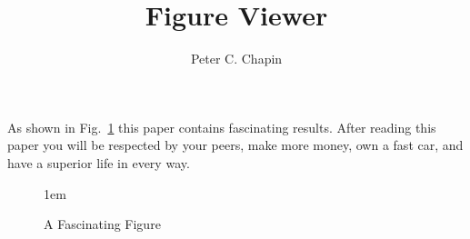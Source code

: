 \documentclass{article}
\newenvironment{textbox}[1]{
  \begin{lrbox}{\savebigbox}
  \begin{minipage}{#1}
  \vspace{1.0em}
}
{
  \vspace{0.50em}
  \end{minipage}
  \end{lrbox}\framebox[\textwidth]{\hfill\fbox{\usebox{\savebigbox}}\hfill}
}
\begin{document}
\title{Figure Viewer}
\author{Peter C. Chapin}
\maketitle


As shown in Fig.~\ref{fig:fascinating} this paper contains fascinating results. After reading
this paper you will be respected by your peers, make more money, own a fast car, and have a
superior life in every way.

%
%

\begin{figure}[htbp]
  
  \centerline{\raise 1em\box\graph}
  \caption{A Fascinating Figure}
  \label{fig:fascinating}
\end{figure}
\end{document}
